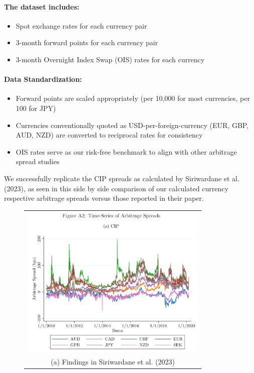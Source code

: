 \documentclass{article}
\begin{document}
\begin{appendices}
\paragraph{The dataset includes:}
\begin{itemize}
    \item Spot exchange rates for each currency pair
    \item 3-month forward points for each currency pair
    \item 3-month Overnight Index Swap (OIS) rates for each currency
\end{itemize}

\paragraph{Data Standardization:}
\begin{itemize}
    \item Forward points are scaled appropriately (per 10,000 for most currencies, per 100 for JPY)
    \item Currencies conventionally quoted as USD-per-foreign-currency (EUR, GBP, AUD, NZD) are converted to reciprocal rates for consistency
    \item OIS rates serve as our risk-free benchmark to align with other arbitrage spread studies
\end{itemize}

We successfully replicate the CIP spreads as calculated by Siriwardane et al. (2023),
as seen in this side by side comparison of our calculated currency respective
arbitrage spreads versus those reported in their paper.

\begin{figure}
  \centering
  \begin{tabular}{@{}c@{}}
    \includegraphics[width=.7\linewidth,height=210pt,width=350pt]{../docs_src/SegArb_CIP_Timeseries.png} \\[\abovecaptionskip]
    \small (a) Findings in Siriwardane et al. (2023)
  \end{tabular}


\end{figure}
\end{appendices}
\end{document}
